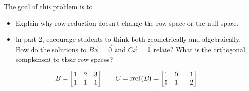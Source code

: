 	\bookonlynewpage
	\question
	\begin{annotation}
		\begin{goals}

			The goal of this problem is to
			\begin{itemize}
				\item Explain why row reduction doesn't change the row space or the null space.
			\end{itemize}
		\end{goals}

		\begin{notes}
			\begin{itemize}
				\item In part 2, encourage students to think both geometrically
					and algebraically. How do the solutions to $B\vec x=\vec 0$ and
					$C\vec x=\vec 0$ relate? What is the orthogonal complement to their row
					spaces?
			\end{itemize}
		\end{notes}
	\end{annotation}
	\[
		B=\mat{1&2&3\\1&1&1}\qquad C=\rref(B)=\mat{1&0&-1\\0&1&2}
	\]
